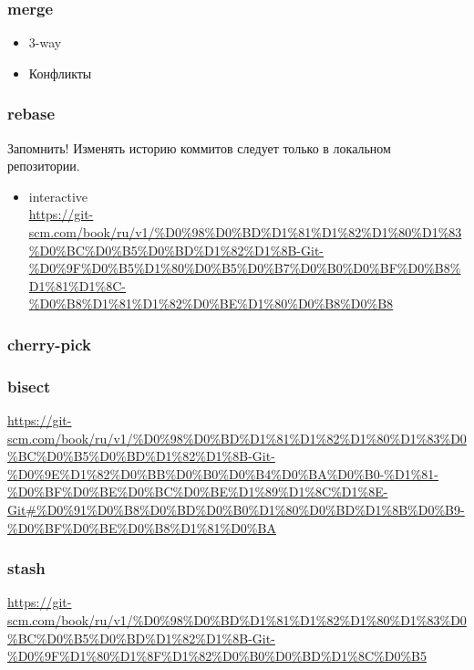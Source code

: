 \documentclass[bigger]{beamer}
\begin{document}
\begin{frame}
\frametitle{merge}
\label{sec-3-7}
\begin{itemize}

\item 3-way
\label{sec-3-7-1}%

\item Конфликты
\label{sec-3-7-2}%
\end{itemize} %
\end{frame}
\begin{frame}
\frametitle{rebase}
\label{sec-3-8}

Запомнить! Изменять историю коммитов следует только в локальном репозитории.
\begin{itemize}

\item interactive\\
\label{sec-3-8-1}%
\href{https://git-scm.com/book/ru/v1/%D0%98%D0%BD%D1%81%D1%82%D1%80%D1%83%D0%BC%D0%B5%D0%BD%D1%82%D1%8B-Git-%D0%9F%D0%B5%D1%80%D0%B5%D0%B7%D0%B0%D0%BF%D0%B8%D1%81%D1%8C-%D0%B8%D1%81%D1%82%D0%BE%D1%80%D0%B8%D0%B8}{https://git-scm.com/book/ru/v1/\%D0\%98\%D0\%BD\%D1\%81\%D1\%82\%D1\%80\%D1\%83\%D0\%BC\%D0\%B5\%D0\%BD\%D1\%82\%D1\%8B-Git-\%D0\%9F\%D0\%B5\%D1\%80\%D0\%B5\%D0\%B7\%D0\%B0\%D0\%BF\%D0\%B8\%D1\%81\%D1\%8C-\%D0\%B8\%D1\%81\%D1\%82\%D0\%BE\%D1\%80\%D0\%B8\%D0\%B8}
\end{itemize} %
\end{frame}
\begin{frame}
\frametitle{cherry-pick}
\label{sec-3-9}
\end{frame}
\begin{frame}
\frametitle{bisect}
\label{sec-3-10}

\href{https://git-scm.com/book/ru/v1/%D0%98%D0%BD%D1%81%D1%82%D1%80%D1%83%D0%BC%D0%B5%D0%BD%D1%82%D1%8B-Git-%D0%9E%D1%82%D0%BB%D0%B0%D0%B4%D0%BA%D0%B0-%D1%81-%D0%BF%D0%BE%D0%BC%D0%BE%D1%89%D1%8C%D1%8E-Git#%D0%91%D0%B8%D0%BD%D0%B0%D1%80%D0%BD%D1%8B%D0%B9-%D0%BF%D0%BE%D0%B8%D1%81%D0%BA}{https://git-scm.com/book/ru/v1/\%D0\%98\%D0\%BD\%D1\%81\%D1\%82\%D1\%80\%D1\%83\%D0\%BC\%D0\%B5\%D0\%BD\%D1\%82\%D1\%8B-Git-\%D0\%9E\%D1\%82\%D0\%BB\%D0\%B0\%D0\%B4\%D0\%BA\%D0\%B0-\%D1\%81-\%D0\%BF\%D0\%BE\%D0\%BC\%D0\%BE\%D1\%89\%D1\%8C\%D1\%8E-Git\#\%D0\%91\%D0\%B8\%D0\%BD\%D0\%B0\%D1\%80\%D0\%BD\%D1\%8B\%D0\%B9-\%D0\%BF\%D0\%BE\%D0\%B8\%D1\%81\%D0\%BA}
\end{frame}
\begin{frame}
\frametitle{stash}
\label{sec-3-11}

\href{https://git-scm.com/book/ru/v1/%D0%98%D0%BD%D1%81%D1%82%D1%80%D1%83%D0%BC%D0%B5%D0%BD%D1%82%D1%8B-Git-%D0%9F%D1%80%D1%8F%D1%82%D0%B0%D0%BD%D1%8C%D0%B5}{https://git-scm.com/book/ru/v1/\%D0\%98\%D0\%BD\%D1\%81\%D1\%82\%D1\%80\%D1\%83\%D0\%BC\%D0\%B5\%D0\%BD\%D1\%82\%D1\%8B-Git-\%D0\%9F\%D1\%80\%D1\%8F\%D1\%82\%D0\%B0\%D0\%BD\%D1\%8C\%D0\%B5}
\end{frame}
\end{document}
